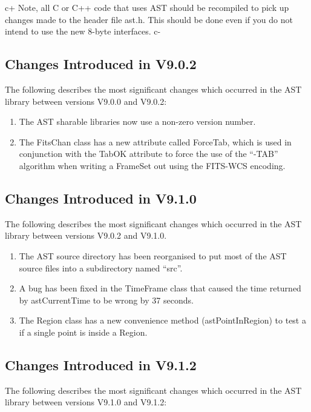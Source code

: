 \documentclass[twoside,11pt]{starlink}
\begin{document}
c+
Note, all C or C++ code that uses AST should be recompiled to pick up
changes made to the header file ast.h.  This should be done even if you
do not intend to use the new 8-byte interfaces.
c-

\subsection{Changes Introduced in V9.0.2}
The following describes the most significant changes which
occurred in the AST library between versions V9.0.0 and V9.0.2:

\begin{enumerate}
\item The AST sharable libraries now use a non-zero version number.
\item The FitsChan class has a new attribute called ForceTab, which is used
in conjunction with the TabOK attribute to force the use of the
``-TAB'' algorithm when writing a FrameSet out using the FITS-WCS encoding.

\end{enumerate}


\subsection{Changes Introduced in V9.1.0}
The following describes the most significant changes which
occurred in the AST library between versions V9.0.2 and V9.1.0.

\begin{enumerate}
\item The AST source directory has been reorganised to put most of the AST
source files into a subdirectory named ``src''.

\item A bug has been fixed in the TimeFrame class that caused the time
returned by astCurrentTime to be wrong by 37 seconds.

\item The Region class has a new convenience method (astPointInRegion) to
test a if a single point is inside a Region.

\end{enumerate}

\subsection{Changes Introduced in V9.1.2}
The following describes the most significant changes which
occurred in the AST library between versions V9.1.0 and V9.1.2:
\end{document}

